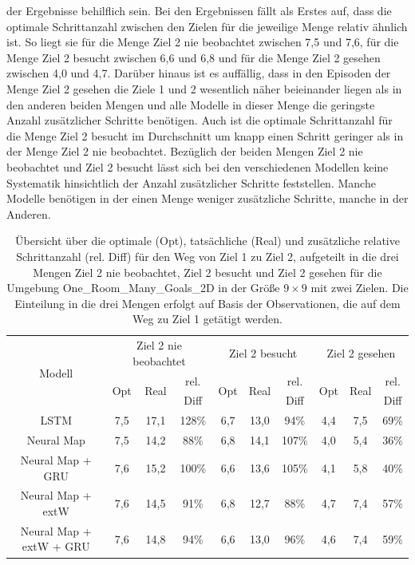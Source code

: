 der Ergebnisse behilflich sein. Bei den Ergebnissen fällt als Erstes auf, dass die optimale Schrittanzahl zwischen den Zielen für die jeweilige Menge relativ ähnlich ist. So liegt sie für die Menge \glqq Ziel 2 nie beobachtet\grqq{} zwischen 7,5 und 7,6, für die Menge \glqq Ziel 2 besucht\grqq{} zwischen 6,6 und 6,8 und für die Menge \glqq Ziel 2 gesehen\grqq{} zwischen 4,0 und 4,7. Darüber hinaus ist es auffällig, dass in den Episoden der Menge \glqq Ziel 2 gesehen\grqq{} die Ziele 1 und 2 wesentlich näher beieinander liegen als in den anderen beiden Mengen und alle Modelle in dieser Menge die geringste Anzahl zusätzlicher Schritte benötigen. Auch ist die optimale Schrittanzahl für die Menge \glqq Ziel 2 besucht\grqq{} im Durchschnitt um knapp einen Schritt geringer als in der Menge \glqq Ziel 2 nie beobachtet\grqq{}. Bezüglich der beiden Mengen \glqq Ziel 2 nie beobachtet\grqq{} und \glqq Ziel 2 besucht\grqq{} lässt sich bei den verschiedenen Modellen keine Systematik hinsichtlich der Anzahl zusätzlicher Schritte feststellen. Manche Modelle benötigen in der einen Menge weniger zusätzliche Schritte, manche in der Anderen.

\begin{table}
  \begin{tabular}{|c|c|c|c|c|c|c|c|c|c|}
    \hline
    \multirow{3}{*}{Modell} & \multicolumn{3}{|c|}{Ziel 2 nie beobachtet} & \multicolumn{3}{|c|}{Ziel 2 besucht} & \multicolumn{3}{|c|}{Ziel 2 gesehen} \\ \cline{2-10}
    & \multirow{2}{*}{Opt} & \multirow{2}{*}{Real} & rel. & \multirow{2}{*}{Opt} & \multirow{2}{*}{Real} & rel. & \multirow{2}{*}{Opt} & \multirow{2}{*}{Real} & rel. \\
    & & & Diff & & & Diff & & & Diff \\ \hline
    LSTM & 7,5 & 17,1 & 128\% & 6,7 & 13,0 & 94\% & 4,4 & 7,5 & 69\% \\ \hline
    Neural Map & 7,5 & 14,2 & 88\% & 6,8 & 14,1 & 107\% & 4,0 & 5,4 & 36\% \\ \hline
    Neural Map + GRU & 7,6 & 15,2 & 100\% & 6,6 & 13,6 & 105\% & 4,1 & 5,8 & 40\% \\ \hline
    Neural Map + extW & 7,6 & 14,5 & 91\% & 6,8 & 12,7 & 88\% & 4,7 & 7,4 & 57\% \\ \hline
    Neural Map + extW + GRU & 7,6 & 14,8 & 94\% & 6,6 & 13,0 & 96\% & 4,6 & 7,4 & 59\% \\ \hline
  \end{tabular}
  \caption{Übersicht über die optimale (Opt), tatsächliche (Real) und zusätzliche relative Schrittanzahl (rel. Diff) für den Weg von Ziel 1 zu Ziel 2, aufgeteilt in die drei Mengen \glqq Ziel 2 nie beobachtet\grqq{}, \glqq Ziel 2 besucht\grqq{} und \glqq Ziel 2 gesehen\grqq{} für die Umgebung \glqq One\_Room\_Many\_Goals\_2D\grqq{} in der Größe $9 \times 9$ mit zwei Zielen. Die Einteilung in die drei Mengen erfolgt auf Basis der Observationen, die auf dem Weg zu Ziel 1 getätigt werden.}
  \label{results9x9_1_to_2_per_M}
\end{table}


